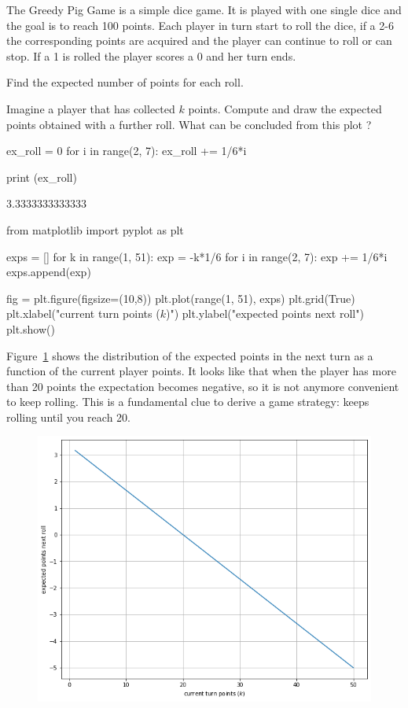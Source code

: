 \begin{question}
\label{ex:greedy_pig}
The Greedy Pig Game is a simple dice game. It is played with one single dice and the goal is to reach 100 points. Each player in turn start to roll the dice, if a 2-6 the corresponding points are acquired and the player can continue to roll or can stop. If a 1 is rolled the player scores a 0 and her turn ends.

Find the expected number of points for each roll.

Imagine a player that has collected $k$ points. Compute and draw the expected points obtained with a further roll. What can be concluded from this plot ?
\end{question}

\cprotEnv\begin{solution}
\begin{ipython}
ex_roll = 0
for i in range(2, 7):
    ex_roll += 1/6*i

print (ex_roll)
\end{ipython}
\begin{ioutput}
3.3333333333333
\end{ioutput}

\begin{ipython}
from matplotlib import pyplot as plt

exps = []
for k in range(1, 51):
    exp = -k*1/6
    for i in range(2, 7):
        exp += 1/6*i
    exps.append(exp)

fig = plt.figure(figsize=(10,8))
plt.plot(range(1, 51), exps)
plt.grid(True)
plt.xlabel("current turn points ($k$)")
plt.ylabel("expected points next roll")
plt.show()
\end{ipython}

Figure~\ref{fig:greedy_pig_expec} shows the distribution of the expected points in the next turn as a function of the current player points. It looks like that when the player has more than 20 points the expectation becomes negative, so it is not anymore convenient to keep rolling. This is a fundamental clue to derive a game strategy: keeps rolling until you reach 20.

\begin{figure}[htbp]
	\begin{center}
		\includegraphics[width=0.7\linewidth]{figures/greedy_pig_expectation}
	\end{center}
\label{fig:greedy_pig_expec}
\end{figure}
\end{solution}
